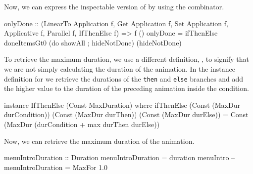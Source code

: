 Now, we can express the inspectable version of  by using the  combinator.

\begin{code}
onlyDone :: (LinearTo Application f, Get Application f,
  Set Application f, Applicative f, Parallel f, IfThenElse f)
  => f ()
onlyDone = ifThenElse doneItemsGt0
  (do showAll ; hideNotDone)
  (hideNotDone)
\end{code}

To retrieve the maximum duration, we use a different  definition, , to signify that we are not simply calculating the duration of the animation. In the instance definition for  we retrieve the durations of the \texttt{then} and \texttt{else} branches and add the higher value to the duration of the preceding animation inside the condition.

\begin{code}
instance IfThenElse (Const MaxDuration) where
  ifThenElse (Const (MaxDur durCondition))
             (Const (MaxDur durThen))
             (Const (MaxDur durElse)) =
    Const (MaxDur (durCondition + max durThen durElse))
\end{code}

Now, we can retrieve the maximum duration of the  animation.

\begin{spec}
menuIntroDuration :: Duration
menuIntroDuration = duration menuIntro
-- menuIntroDuration = MaxFor 1.0
\end{spec}
